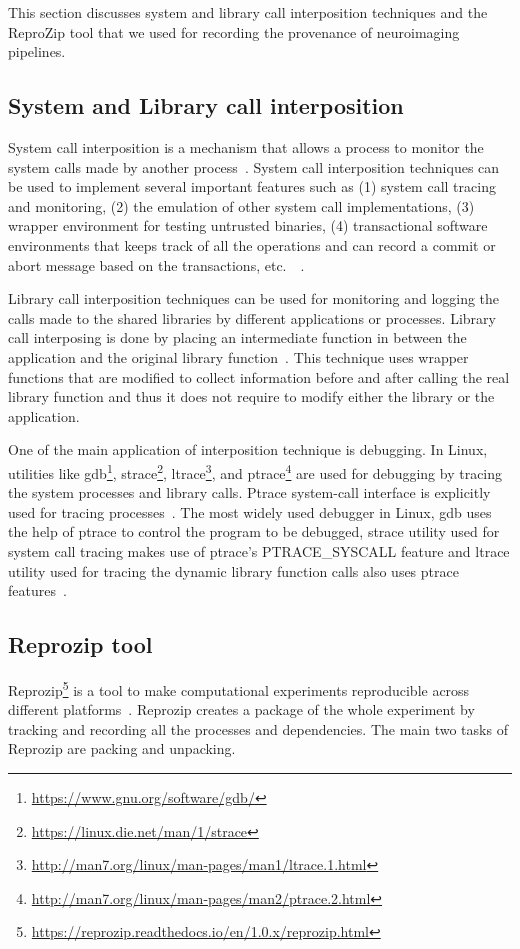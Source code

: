 This section discusses system and library call interposition techniques and the ReproZip tool that we used for recording the provenance of neuroimaging pipelines.
\subsection{System and Library call interposition}
System call interposition is a mechanism that allows a process to monitor the system calls made by another process~\cite{Jain00user-levelinfrastructure}. System call interposition techniques can be used to implement several important features such as (1) system call tracing and monitoring, (2) the emulation of other system call implementations, (3) wrapper environment for testing untrusted binaries, (4) transactional software environments that keeps track of all the operations and can record a commit or abort message based on the transactions, etc.\ ~\cite{Jones93}.

Library call interposition techniques can be used for monitoring and logging the calls made to the shared libraries by different applications or processes. Library call interposing is done by placing an intermediate function in between the application and the original library function~\cite{Curry:1994:PTD:1267257.1267275}. This technique uses wrapper functions that are modified to collect information before and after calling the real library function and thus it does not require to modify either the library or the application.

One of the main application of interposition technique is debugging. In Linux, utilities like gdb\footnote{\url{https://www.gnu.org/software/gdb/}}, strace\footnote{\url{https://linux.die.net/man/1/strace}}, ltrace\footnote{\url{http://man7.org/linux/man-pages/man1/ltrace.1.html}}, and ptrace\footnote{\url{http://man7.org/linux/man-pages/man2/ptrace.2.html}} are used for debugging by tracing the system processes and library calls. Ptrace system-call interface is explicitly used for tracing processes~\cite{Keniston_ptrace}. The most widely used debugger in Linux, gdb uses the help of ptrace to control the program to be debugged, strace utility used for system call tracing makes use of ptrace's PTRACE\_SYSCALL feature and ltrace utility used for tracing the dynamic library function calls also uses ptrace features~\cite{Keniston_ptrace}.

\subsection{Reprozip tool}
Reprozip\footnote{\url{https://reprozip.readthedocs.io/en/1.0.x/reprozip.html}} is a tool to make computational experiments reproducible across different platforms~\cite{Chirigati:2013:RUP:2482613.2482614}. Reprozip creates a package of the whole experiment by tracking and recording all the processes and dependencies. The main two tasks of Reprozip are packing and unpacking.

